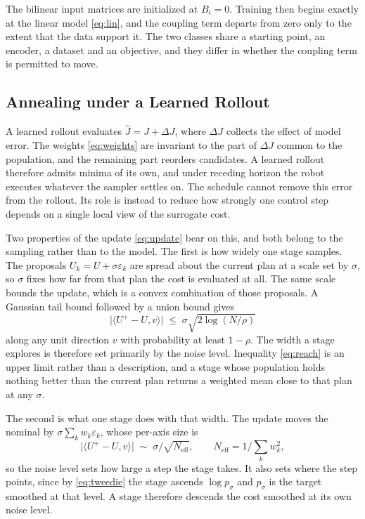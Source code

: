 \documentclass[letterpaper,10pt,conference]{ieeeconf}
\begin{document}
The bilinear input matrices are initialized at $B_i = 0$.
Training then begins exactly at the linear model \eqref{eq:lin}, and the coupling term departs from zero only to the extent that the data support it.
The two classes share a starting point, an encoder, a dataset and an objective, and they differ in whether the coupling term is permitted to move.

\subsection{Annealing under a Learned Rollout}\label{subsec:anneal}

A learned rollout evaluates $\hat{J} = J + \Delta J$, where $\Delta J$ collects the effect of model error.
The weights \eqref{eq:weights} are invariant to the part of $\Delta J$ common to the population, and the remaining part reorders candidates.
A learned rollout therefore admits minima of its own, and under receding horizon the robot executes whatever the sampler settles on.
The schedule cannot remove this error from the rollout.
Its role is instead to reduce how strongly one control step depends on a single local view of the surrogate cost.

Two properties of the update \eqref{eq:update} bear on this, and both belong to the sampling rather than to the model.
The first is how widely one stage samples.
The proposals $U_k = U + \sigma \varepsilon_k$ are spread about the current plan at a scale set by $\sigma$, so $\sigma$ fixes how far from that plan the cost is evaluated at all.
The same scale bounds the update, which is a convex combination of those proposals.
A Gaussian tail bound followed by a union bound gives
\begin{equation}
\big|\langle U^{+} - U, v\rangle\big| \;\le\; \sigma \sqrt{2 \log (N/\rho)}
\label{eq:reach}
\end{equation}
along any unit direction $v$ with probability at least $1-\rho$.
The width a stage explores is therefore set primarily by the noise level.
Inequality \eqref{eq:reach} is an upper limit rather than a description, and a stage whose population holds nothing better than the current plan returns a weighted mean close to that plan at any $\sigma$.

The second is what one stage does with that width.
The update moves the nominal by $\sigma \sum_k w_k \varepsilon_k$, whose per-axis size is
\begin{equation}
\big|\langle U^{+} - U, v\rangle\big| \;\sim\; \sigma \big/ \sqrt{N_{\mathrm{eff}}},
\qquad N_{\mathrm{eff}} = 1 \big/ \textstyle\sum_k w_k^{2},
\label{eq:step}
\end{equation}
so the noise level sets how large a step the stage takes.
It also sets where the step points, since by \eqref{eq:tweedie} the stage ascends $\log p_{\sigma}$ and $p_\sigma$ is the target smoothed at that level.
A stage therefore descends the cost smoothed at its own noise level.
\end{document}
